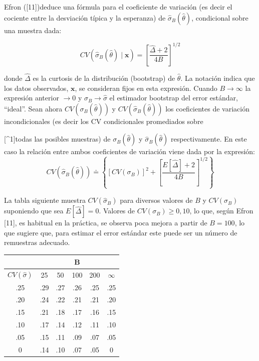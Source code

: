 \documentclass[
]{article}
\begin{document}
Efron ({[}11{]})deduce una fórmula para el coeficiente de variación (es decir el cociente entre la desviación típica y la esperanza) de \(\hat{\sigma}_{B}(\hat{\theta})\), condicional sobre una muestra dada:

\[
C V\left(\hat{\sigma}_{B}(\hat{\theta}) \mid \mathbf{x}\right)=\left[\frac{\hat{\Delta}+2}{4 B}\right]^{1 / 2}
\]

donde \(\hat{\Delta}\) es la curtosis de la distribución (bootstrap) de \(\hat{\theta}\). La notación indica que los datos observados, \(\mathbf{x}\), se consideran fijos en esta expresión. Cuando \(B \rightarrow \infty\) la expresión anterior \(\rightarrow 0\) y \(\sigma_{B} \rightarrow \hat{\sigma}\) el estimador bootstrap del error estándar, ``ideal''. Sean ahora \(C V\left(\sigma_{B}(\hat{\theta})\right)\) y \(C V\left(\hat{\sigma}_{B}(\hat{\theta})\right)\) los coeficientes de variación incondicionales (es decir los CV condicionales promediados sobre

{[}\^{}1{]}todas las posibles muestras) de \(\sigma_{B}(\hat{\theta})\) y \(\hat{\sigma}_{B}(\hat{\theta})\) respectivamente. En este caso la relación entre ambos coeficientes de variación viene dada por la expresión:
\[
C V\left(\hat{\sigma}_{B}(\hat{\theta})\right) \doteq\left\{\left[C V\left(\sigma_{B}\right)\right]^{2}+\left[\frac{E[\hat{\Delta}]+2}{4 B}\right]^{1 / 2}\right\}
\]

La tabla siguiente muestra \(C V\left(\hat{\sigma}_{B}\right)\) para diversos valores de \(B\) y \(C V\left(\sigma_{B}\right)\) suponiendo que sea \(E[\hat{\Delta}]=0\). Valores de \(C V\left(\sigma_{B}\right) \geq 0,10\), lo que, según Efron {[}11{]}, es habitual en la práctica, se observa poca mejora a partir de \(B=100\), lo que sugiere que, para estimar el error estándar este puede ser un número de remuestras adecuado.

\begin{longtable}[]{@{}cccccc@{}}
\toprule\noalign{}
& & & B & & \\
\midrule\noalign{}
\endhead
\bottomrule\noalign{}
\endlastfoot
\(C V(\hat{\sigma})\) & 25 & 50 & 100 & 200 & \(\infty\) \\
.25 & .29 & .27 & .26 & .25 & .25 \\
.20 & .24 & .22 & .21 & .21 & .20 \\
.15 & .21 & .18 & .17 & .16 & .15 \\
.10 & .17 & .14 & .12 & .11 & .10 \\
.05 & .15 & .11 & .09 & .07 & .05 \\
0 & .14 & .10 & .07 & .05 & 0 \\
\end{longtable}
\end{document}
